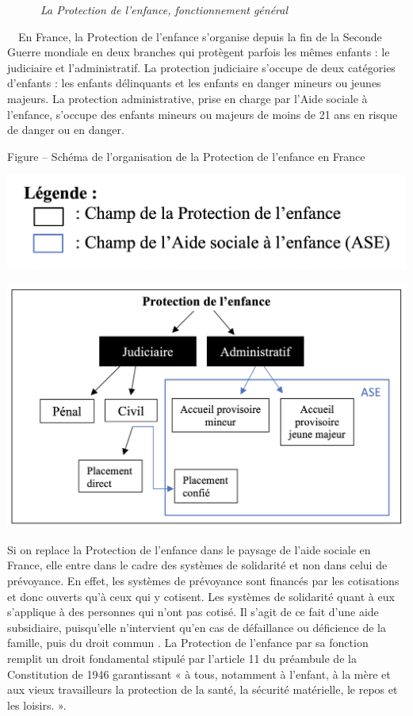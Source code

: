 \documentclass[
  12,
  a4paper,
]{report}
\begin{document}
~~~~~~\emph{La Protection de l'enfance, fonctionnement général}

~~En France, la Protection de l'enfance s'organise depuis la fin de la
Seconde Guerre mondiale en deux branches qui protègent parfois les mêmes
enfants : le judiciaire et l'administratif. La protection judiciaire
s'occupe de deux catégories d'enfants : les enfants délinquants et les
enfants en danger mineurs ou jeunes majeurs. La protection
administrative, prise en charge par l'Aide sociale à l'enfance, s'occupe
des enfants mineurs ou majeurs de moins de 21 ans en risque de danger ou
en danger.

Figure -- Schéma de l'organisation de la Protection de l'enfance en
France

\begin{center}\includegraphics[width=0.4\linewidth]{Figure/SCleg} \end{center}

\begin{center}\includegraphics[width=0.6\linewidth]{Figure/SC1} \end{center}

Si on replace la Protection de l'enfance dans le paysage de l'aide
sociale en France, elle entre dans le cadre des systèmes de solidarité
et non dans celui de prévoyance. En effet, les systèmes de prévoyance
sont financés par les cotisations et donc ouverts qu'à ceux qui y
cotisent. Les systèmes de solidarité quant à eux s'applique à des
personnes qui n'ont pas cotisé. Il s'agit de ce fait d'une aide
subsidiaire, puisqu'elle n'intervient qu'en cas de défaillance ou
déficience de la famille, puis du droit commun . La Protection de
l'enfance par sa fonction remplit un droit fondamental stipulé par
l'article 11 du préambule de la Constitution de 1946 garantissant « à
tous, notamment à l'enfant, à la mère et aux vieux travailleurs la
protection de la santé, la sécurité matérielle, le repos et les loisirs.
».
\end{document}
